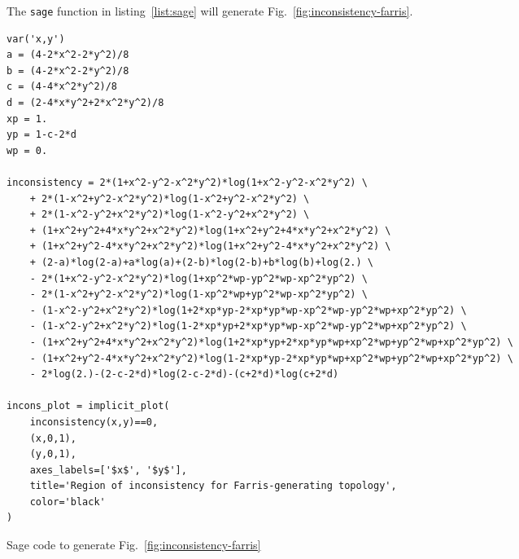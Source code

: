 \documentclass[a4paper]{article}
\begin{document}
The \texttt{sage} function in listing~\ref{list:sage} will generate Fig.~\ref{fig:inconsistency-farris}.

\begin{table}
    \begin{center}
\begin{verbatim}
var('x,y')
a = (4-2*x^2-2*y^2)/8
b = (4-2*x^2-2*y^2)/8
c = (4-4*x^2*y^2)/8
d = (2-4*x*y^2+2*x^2*y^2)/8
xp = 1.
yp = 1-c-2*d
wp = 0.

inconsistency = 2*(1+x^2-y^2-x^2*y^2)*log(1+x^2-y^2-x^2*y^2) \
    + 2*(1-x^2+y^2-x^2*y^2)*log(1-x^2+y^2-x^2*y^2) \
    + 2*(1-x^2-y^2+x^2*y^2)*log(1-x^2-y^2+x^2*y^2) \
    + (1+x^2+y^2+4*x*y^2+x^2*y^2)*log(1+x^2+y^2+4*x*y^2+x^2*y^2) \
    + (1+x^2+y^2-4*x*y^2+x^2*y^2)*log(1+x^2+y^2-4*x*y^2+x^2*y^2) \
    + (2-a)*log(2-a)+a*log(a)+(2-b)*log(2-b)+b*log(b)+log(2.) \
    - 2*(1+x^2-y^2-x^2*y^2)*log(1+xp^2*wp-yp^2*wp-xp^2*yp^2) \
    - 2*(1-x^2+y^2-x^2*y^2)*log(1-xp^2*wp+yp^2*wp-xp^2*yp^2) \
    - (1-x^2-y^2+x^2*y^2)*log(1+2*xp*yp-2*xp*yp*wp-xp^2*wp-yp^2*wp+xp^2*yp^2) \
    - (1-x^2-y^2+x^2*y^2)*log(1-2*xp*yp+2*xp*yp*wp-xp^2*wp-yp^2*wp+xp^2*yp^2) \
    - (1+x^2+y^2+4*x*y^2+x^2*y^2)*log(1+2*xp*yp+2*xp*yp*wp+xp^2*wp+yp^2*wp+xp^2*yp^2) \
    - (1+x^2+y^2-4*x*y^2+x^2*y^2)*log(1-2*xp*yp-2*xp*yp*wp+xp^2*wp+yp^2*wp+xp^2*yp^2) \
    - 2*log(2.)-(2-c-2*d)*log(2-c-2*d)-(c+2*d)*log(c+2*d)

incons_plot = implicit_plot(
    inconsistency(x,y)==0,
    (x,0,1),
    (y,0,1),
    axes_labels=['$x$', '$y$'],
    title='Region of inconsistency for Farris-generating topology',
    color='black'
)
\end{verbatim}
    \end{center}
\caption{Sage code to generate Fig.~\ref{fig:inconsistency-farris}}
\label{list:sage}
\end{table}
\end{document}

